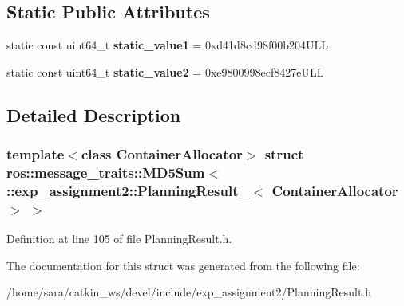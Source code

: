 \subsection*{Static Public Attributes}
\begin{DoxyCompactItemize}
\item 
\mbox{\label{structros_1_1message__traits_1_1MD5Sum_3_01_1_1exp__assignment2_1_1PlanningResult___3_01ContainerAllocator_01_4_01_4_a9a7e4245387141597a5bf2e010975fc0}} 
static const uint64\+\_\+t {\bfseries static\+\_\+value1} = 0xd41d8cd98f00b204\+U\+LL
\item 
\mbox{\label{structros_1_1message__traits_1_1MD5Sum_3_01_1_1exp__assignment2_1_1PlanningResult___3_01ContainerAllocator_01_4_01_4_a23fdbfe819b7b405a8cf7403ebdce069}} 
static const uint64\+\_\+t {\bfseries static\+\_\+value2} = 0xe9800998ecf8427e\+U\+LL
\end{DoxyCompactItemize}


\subsection{Detailed Description}
\subsubsection*{template$<$class Container\+Allocator$>$\newline
struct ros\+::message\+\_\+traits\+::\+M\+D5\+Sum$<$ \+::exp\+\_\+assignment2\+::\+Planning\+Result\+\_\+$<$ Container\+Allocator $>$ $>$}



Definition at line 105 of file Planning\+Result.\+h.



The documentation for this struct was generated from the following file\+:\begin{DoxyCompactItemize}
\item 
/home/sara/catkin\+\_\+ws/devel/include/exp\+\_\+assignment2/Planning\+Result.\+h\end{DoxyCompactItemize}
